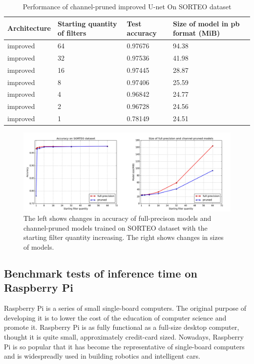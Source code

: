 \documentclass[sigconf]{acmart}
\begin{document}
\begin{table}
 \caption{Performance of channel-pruned improved U-net On SORTEO dataset}
  \centering
  \begin{tabular}{llll}
    \toprule
    Architecture & Starting quantity of filters & Test accuracy  & Size of model in pb format (MiB) \\
    \midrule
    improved & 64 & 0.97676 & 94.38 \\
    \midrule
    improved & 32 & 0.97536 & 41.98 \\
    \midrule
    improved & 16 & 0.97445 & 28.87 \\
    \midrule
    improved &  8 & 0.97406 & 25.59 \\
    \midrule
    improved &  4 & 0.96842 & 24.77\\
    \midrule
    improved &  2 & 0.96728 & 24.56\\
    \midrule
    improved &  1 & 0.78149 & 24.51\\
    \bottomrule
  \end{tabular}
  \label{tab:table4}
\end{table}

\begin{figure}
  \centering
  \includegraphics[width=15cm]{fig4.jpg}
    \caption{The left shows changes in accuracy of full-precison models and channel-pruned models trained on SORTEO dataset with the starting filter quantity increasing. The right shows changes in sizes of models.}
  \label{fig:fig4}
\end{figure}


\subsection{Benchmark tests of inference time on Raspberry Pi}
Raspberry Pi is a series of small single-board computers. The original purpose of developing it is to lower the cost of the education of computer science and promote it. Raspberry Pi is as fully functional as a full-size desktop computer, thought it is quite small, approximately credit-card sized. Nowadays, Raspberry Pi is so popular that it has become the representative of single-board computers and is widespreadly used in building robotics and intelligent cars. 
\end{document}
